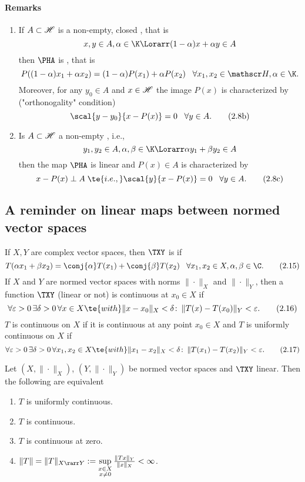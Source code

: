\paragraph{Remarks}
\begin{enumerate}
    \item If $A\subset\mathscr{H}$ is a non-empty, closed , that is
    \[x,y\in A,\alpha\in\K\Lorarr(1-\alpha)x+\alpha y\in A\]
    then $\PHA$ is , that is
    \[P((1-\alpha)x_1+\alpha x_2)=(1-\alpha)P(x_1)+\alpha P(x_2)\;\;\;\forall x_1,x_2\in\H,\alpha\in\K.\]
    Moreover, for any $y_0\in A$ and $x\in\mathscr{H}$ the image $P(x)$ is characterized by ("orthonogality" condition)
    \[\scal{y-y_0}{x-P(x)}=0\;\;\;\forall y\in A.\tag{2.8b}\label{2.8b}\]
    
    \item Is $A\subset\mathscr{H}$ a non-empty , i.e.,
    \[y_1,y_2\in A,\alpha,\beta\in\K\Lorarr \alpha y_1+\beta y_2\in A\]
    then the map $\PHA$ is linear and $P(x)\in A$ is characterized by
    \[x-P(x)\perp A\;\te{ i.e., }\scal{y}{x-P(x)}=0\;\;\;\forall y\in A.\tag{2.8c}\label{2.8c}\]
\end{enumerate}

\subsection{A reminder on linear maps between normed vector spaces}

If $X,Y$ are complex vector spaces, then $\TXY$ is  if
\[T(\alpha x_1+\beta x_2)=\conj{\alpha}T(x_1)+\conj{\beta}T(x_2)\;\;\;\forall x_1,x_2\in X,\alpha,\beta\in\C.\tag{2.15}\label{2.15}\]
If $X$ and $Y$ are normed vector spaces with norms $\|\cdot\|_X$ and $\|\cdot\|_Y$, then a function $\TXY$ (linear or not) is continuous at $x_0\in X$ if
\[\forall\varepsilon>0\,\exists \delta>0\,\forall x\in X\te{ with }\|x-x_0\|_X<\delta\colon\,\|T(x)-T(x_0)\|_Y<\varepsilon.\tag{2.16}\label{2.16}\]
$T$ is continuous on $X$ if it is continuous at any point $x_0\in X$ and $T$ is uniformly continuous on $X$ if
\[\forall\varepsilon>0\,\exists\delta>0\,\forall x_1,x_2\in X\te{ with }\|x_1-x_2\|_X<\delta\colon\,\|T(x_1)-T(x_2)\|_Y<\varepsilon.\tag{2.17}\label{2.17}\]

\begin{thm}\label{ii.8}
    Let $(X,\|\cdot\|_X)$, $(Y,\|\cdot\|_Y)$ be normed vector spaces and $\TXY$ linear. Then the following are equivalent
    \begin{enumerate}[label=\alph*)]
        \item $T$ is uniformly continuous.\label{ii.8.1}
        \item $T$ is continuous.\label{ii.8.2}
        \item $T$ is continuous at zero.\label{ii.8.3}
        \item $\|T\|=\|T\|_{X\rarr Y}:=\sup\limits_{\substack{x\in X\\x\neq0}}\frac{\|Tx\|_Y}{\|x\|_X}<\infty$.\label{ii.8.4}
    \end{enumerate}
\end{thm}

